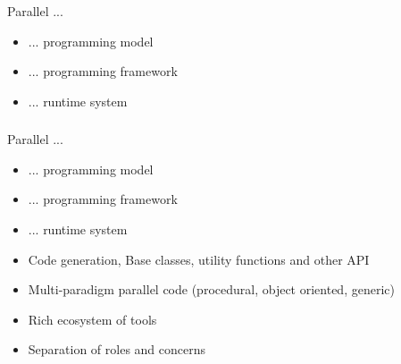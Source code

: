 \begin{frame}[t]
\frametitle{\charm}
\framesubtitle{}
	\begin{block}{Parallel ...}
		\begin{itemize}
		\item \alert<2->{... programming model}
		\item ... programming framework
		\item ... runtime system
	\end{itemize}
	\end{block}
\end{frame}


\begin{frame}[t]
\frametitle{\charm}
\framesubtitle{}
	\begin{block}{Parallel ...}
		\begin{itemize}
		\item ... programming model
		\item \alert{... programming framework}
		\item ... runtime system
	\end{itemize}
	\end{block}
    \begin{itemize}
        \item Code generation, Base classes, utility functions and other API
        \item Multi-paradigm parallel code (procedural, object oriented, generic)
        \item Rich ecosystem of tools
        \item Separation of roles and concerns
    \end{itemize}
\end{frame}


